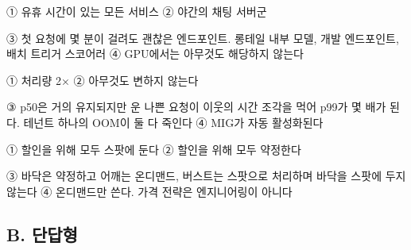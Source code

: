 
\begin{tbboptions}
  \item ① 유휴 시간이 있는 모든 서비스        ② 야간의 채팅 서버군
  \item ③ 첫 요청에 몇 분이 걸려도 괜찮은 엔드포인트. 롱테일 내부 모델, 개발 엔드포인트, 배치 트리거 스코어러        ④ GPU에서는 아무것도 해당하지 않는다
\end{tbboptions}


\begin{tbboptions}
  \item ① 처리량 2×        ② 아무것도 변하지 않는다
  \item ③ p50은 거의 유지되지만 운 나쁜 요청이 이웃의 시간 조각을 먹어 p99가 몇 배가 된다. 테넌트 하나의 OOM이 둘 다 죽인다        ④ MIG가 자동 활성화된다
\end{tbboptions}


\begin{tbboptions}
  \item ① 할인을 위해 모두 스팟에 둔다        ② 할인을 위해 모두 약정한다
  \item ③ 바닥은 약정하고 어깨는 온디맨드, 버스트는 스팟으로 처리하며 바닥을 스팟에 두지 않는다        ④ 온디맨드만 쓴다. 가격 전략은 엔지니어링이 아니다
\end{tbboptions}

\subsection*{B. 단답형}





